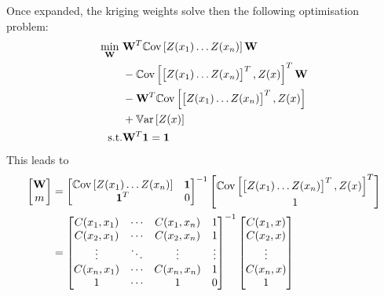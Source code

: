 \documentclass[../../Main_ManuscritThese.tex]{subfiles}
\begin{document}
Once expanded, the kriging weights solve then the following optimisation problem:
\begin{align}
  \min_{\mathbf{W}} ~&\mathbf{W}^T \mathbb{C}\mathrm{ov}\left[Z(x_1) \dots Z(x_n)\right] \mathbf{W}\\ &-\mathbb{C}\mathrm{ov}\left[
    \begin{bmatrix}
      Z(x_1) \dots Z(x_n)
    \end{bmatrix}^T, Z(x) \right]^T \mathbf{W}\\ &- \mathbf{W}^T\mathbb{C}\mathrm{ov}\left[
    \begin{bmatrix}
      Z(x_1) \dots Z(x_n)
    \end{bmatrix}^T, Z(x) \right] \\ &+ \mathbb{V}\mathrm{ar}\left[Z(x)\right] \\
  \text{s.t.}& \mathbf{W}^T \mathbf{1} = \mathbf{1}
\end{align}
This leads to
\begin{align}
  \begin{bmatrix}
    \mathbf{W} \\ m
  \end{bmatrix}
  &=
  \begin{bmatrix}
    \mathbb{C}\mathrm{ov}\left[Z(x_1) \dots Z(x_n)\right] & \mathbf{1} \\
  \mathbf{1}^T & 0
\end{bmatrix}^{-1}
                 \begin{bmatrix}
                  \mathbb{C}\mathrm{ov}\left[
    \begin{bmatrix}
      Z(x_1) \dots Z(x_n)
    \end{bmatrix}^T, Z(x) \right]^T \\ 1 
\end{bmatrix}
  \\ &=
    \begin{bmatrix}
      C(x_1, x_1) & \cdots & C(x_1, x_n) & 1 \\
      C(x_2, x_1) & \cdots & C(x_2, x_n) & 1 \\
      \vdots & \ddots & \vdots & \vdots \\
      C(x_n, x_1) & \cdots & C(x_n, x_n)& 1 \\
      1 & \cdots & 1 & 0
    \end{bmatrix}^{-1}
                       \begin{bmatrix}
                         C(x_1, x) \\
                         C(x_2, x) \\
                         \vdots \\
                         C(x_n, x) \\
                         1
                       \end{bmatrix}
\end{align}
\end{document}
